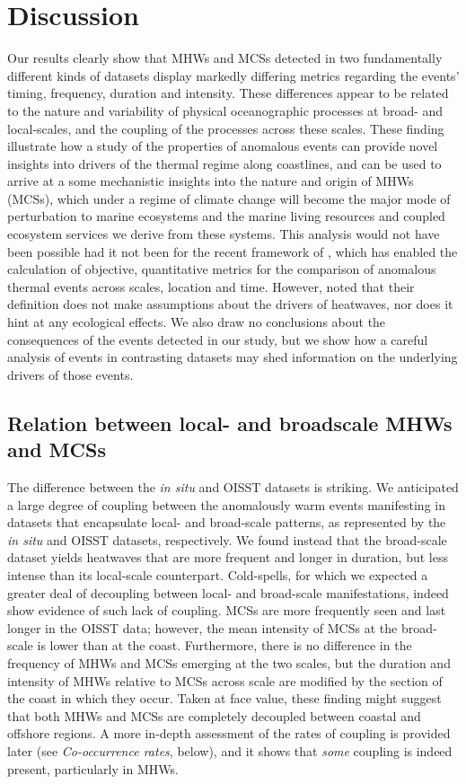 \documentclass[a4paper,10pt,review]{elsarticle}
\begin{document}
\section{Discussion}
Our results clearly show that MHWs and MCSs detected in two fundamentally different kinds of datasets display markedly differing metrics regarding the events' timing, frequency, duration and intensity. These differences appear to be related to the nature and variability of physical oceanographic processes at broad- and local-scales, and the coupling of the processes across these scales. These finding illustrate how a study of the properties of anomalous events can provide novel insights into drivers of the thermal regime along coastlines, and can be used to arrive at a some mechanistic insights into the nature and origin of MHWs (MCSs), which under a regime of climate change will become the major mode of perturbation to marine ecosystems and the marine living resources and coupled ecosystem services we derive from these systems. This analysis would not have been possible had it not been for the recent framework of \citet{Hobday2016}, which has enabled the calculation of objective, quantitative metrics for the comparison of anomalous thermal events across scales, location and time. However, \citet{Hobday2016} noted that their definition does not make assumptions about the drivers of heatwaves, nor does it hint at any ecological effects. We also draw no conclusions about the consequences of the events detected in our study, but we show how a careful analysis of events in contrasting datasets may shed information on the underlying drivers of those events.

\subsection{Relation between local- and broadscale MHWs and MCSs}
The difference between the \emph{in situ} and OISST datasets is striking. We anticipated a large degree of coupling between the anomalously warm events manifesting in datasets that encapsulate local- and broad-scale patterns, as represented by the \emph{in situ} and OISST datasets, respectively. We found instead that the broad-scale dataset yields heatwaves that are more frequent and longer in duration, but less intense than its local-scale counterpart. Cold-spells, for which we expected a greater deal of decoupling between local- and broad-scale manifestations, indeed show evidence of such lack of coupling. MCSs are more frequently seen and last longer in the OISST data; however, the mean intensity of MCSs at the broad-scale is lower than at the coast. Furthermore, there is no difference in the frequency of MHWs and MCSs emerging at the two scales, but the duration and intensity of MHWs relative to MCSs across scale are modified by the section of the coast in which they occur. Taken at face value, these finding might suggest that both MHWs and MCSs are completely decoupled between coastal and offshore regions. A more in-depth assessment of the rates of coupling is provided later (see \emph{Co-occurrence rates}, below), and it shows that \emph{some} coupling is indeed present, particularly in MHWs.
\end{document}
